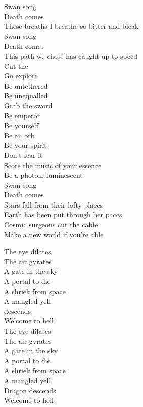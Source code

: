Swan song \\
Death comes \\
These breaths I breathe so bitter and bleak \\
Swan song \\
Death comes \\
This path we chose has caught up to speed \\

Cut the  \\
Go explore \\
Be untethered \\
Be unequalled \\
Grab the sword \\
Be emperor \\
Be yourself \\
Be an orb \\
Be your spirit \\
Don't fear it \\
Score the music of your essence \\
Be a photon, luminescent \\
Swan song \\
Death comes \\

Stars fall from their lofty places \\
Earth has been put through her paces \\
Cosmic surgeons cut the cable \\
Make a new world if you're able \\


The eye dilates \\
The air gyrates \\
A gate in the sky \\
A portal to die \\
A shriek from space \\
A mangled yell \\
 descends \\
Welcome to hell \\

The eye dilates \\
The air gyrates \\
A gate in the sky \\
A portal to die \\
A shriek from space \\
A mangled yell \\
Dragon descends \\
Welcome to hell \\

